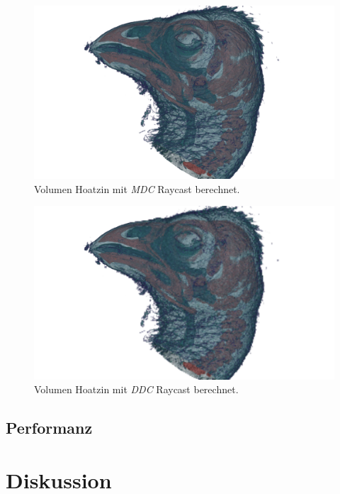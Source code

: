 \begin{landscape}
	\begin{figure}
		\centering
		\includegraphics[width=1\textheight]{../../Grafiken/results/picture_quality/hoatzin/MDC_img-0-96_ray-1-5.png}
		\caption{Volumen Hoatzin mit \emph{MDC} Raycast berechnet.}
		\label{fig::res::hoa_mdc}
	\end{figure}
\end{landscape}

\begin{landscape}
	\begin{figure}
		\centering
		\includegraphics[width=1\textheight]{../../Grafiken/results/picture_quality/hoatzin/DDC_img-1_ray-1-5.png}
		\caption{Volumen Hoatzin mit \emph{DDC} Raycast berechnet.}
		\label{fig::res::hoa_ddc}
	\end{figure}
\end{landscape}
\fi

\subsection{Performanz}






\section*{Diskussion}\label{sec::disc}
